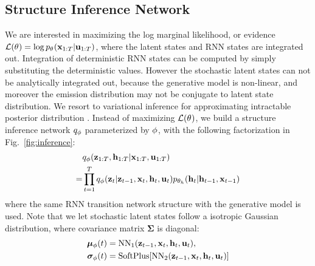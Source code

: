 \documentclass{article}
\begin{document}
\subsection{Structure Inference Network}
We are interested in maximizing the log marginal likelihood, or evidence $\mcL(\bt) = \log \pT(\bx_{1:T}|\bu_{1:T})$, where the latent states and RNN states are integrated out. Integration of deterministic RNN states can be computed by simply substituting the deterministic values. However the stochastic latent states can not be analytically integrated out, because the generative model is non-linear, and moreover the emission distribution may not be conjugate to latent state distribution. We resort to variational inference for approximating intractable posterior distribution \cite{jordan1999introduction}. Instead of maximizing $\mcL(\bt)$, we build a structure inference network $\qPhi$ parameterized by $\bphi$, with the following factorization in Fig.~\ref{fig:inference}:
\begin{equation}\label{eq:qphi_fact}
\begin{split}
    &\qPhi(\bz_{1:T}, \bh_{1:T}|\bx_{1:T},\bu_{1:T}) \\
    =&\prod_{t=1}^{T}\qPhi(\bz_t|\bz_{t-1},\bx_t,\bh_t, \bu_t)\pT[h](\bh_t|\bh_{t-1},\bx_{t-1})
    \end{split}
\end{equation}
where the same RNN transition network structure with the generative model is used. Note that we let stochastic latent states follow a isotropic Gaussian distribution, where covariance matrix $\bm{\Sigma}$ is diagonal: 
\begin{equation}\label{eq:param_inference}
\begin{split}
    \bmu_{\bphi}(t) &= \text{NN}_1 (\bz_{t-1}, \bx_t, \bh_t, \bu_t),\\
    \bsigma_{\bphi}(t) &= \text{SoftPlus}[\text{NN}_2 (\bz_{t-1}, \bx_t, \bh_t, \bu_t)]
\end{split}
\end{equation}
\end{document}
